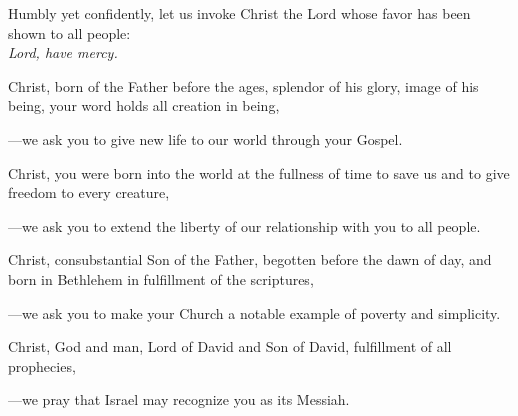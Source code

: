 \intercessions\indent

\begin{hangpar}

Humbly yet confidently, let us invoke Christ the Lord whose favor has been shown to all people:\\
\emph{Lord, have mercy.}

\medskip Christ, born of the Father before the ages, splendor of his glory, image of his being, your word holds all creation in being,

{\color{red}---\thinspace}we ask you to give new life to our world through your Gospel.

\medskip Christ, you were born into the world at the fullness of time to save us and to give freedom to every creature,

{\color{red}---\thinspace}we ask you to extend the liberty of our relationship with you to all people.

\medskip Christ, consubstantial Son of the Father, begotten before the dawn of day, and born in Bethlehem in fulfillment of the scriptures,

{\color{red}---\thinspace}we ask you to make your Church a notable example of poverty and simplicity.

\medskip Christ, God and man, Lord of David and Son of David, fulfillment of all prophecies,

{\color{red}---\thinspace}we pray that Israel may recognize you as its Messiah.

\medskip

\end{hangpar}